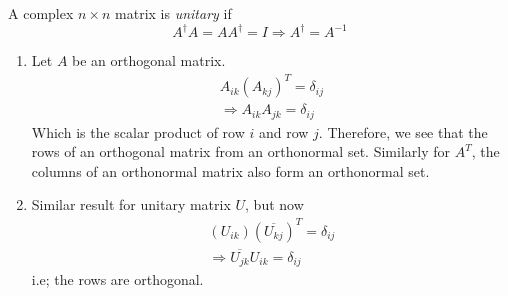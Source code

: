 \documentclass{article}
\numberwithin{equation}{section}
\begin{document}
\begin{defi}[Unitary]
    A complex $n \times n$ matrix is \emph{unitary} if
    \[
        A^\dagger A = AA^\dagger = I \Rightarrow A^\dagger = A^{-1}  
    \]
\end{defi}
\begin{remark}\leavevmode
    \begin{enumerate}
        \item Let $A$ be an orthogonal matrix.
        \begin{align*}
            A_{ik}(A_{kj})^T = \delta_{ij} \\
            \Rightarrow A_{ik}A_{jk} = \delta_{ij}
        \end{align*}
        Which is the scalar product of row $i$ and row $j$.
        Therefore, we see that the rows of an orthogonal matrix from an orthonormal set.
        Similarly for $A^T$, the columns of an orthonormal matrix also form an orthonormal set.
        

        \item Similar result for unitary matrix $U$, but now
        \begin{align*}
            (U_{ik})(\overline{U_{kj}})^T = \delta_{ij} \\
            \Rightarrow  \overline{U_{jk}} U_{ik} = \delta_{ij}
        \end{align*}
        i.e; the rows are orthogonal.
    \end{enumerate}
\end{remark}
\end{document}
